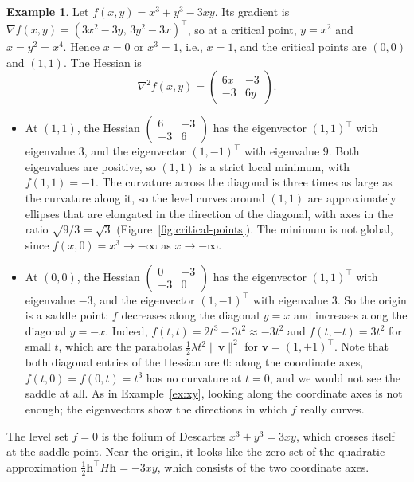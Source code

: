 \documentclass[11pt]{article}
\newcommand{\norm}[1]{\lVert #1 \rVert}
\theoremstyle{definition}
\newtheorem{example}[definition]{Example}
\theoremstyle{plain}
\theoremstyle{remark}
\begin{document}
\begin{example}\label{ex:critical-points}
    Let $f(x, y) = x^3 + y^3 - 3xy$. Its gradient is $\nabla f(x, y) = (3x^2 - 3y, \, 3y^2 - 3x)^\top$, so at a critical point, $y = x^2$ and $x = y^2 = x^4$. Hence $x = 0$ or $x^3 = 1$, i.e., $x = 1$, and the critical points are $(0, 0)$ and $(1, 1)$. The Hessian is
    \[\nabla^2 f(x, y) = \begin{pmatrix} 6x & -3 \\ -3 & 6y \end{pmatrix}.\]
    \begin{itemize}
        \item At $(1, 1)$, the Hessian $\begin{pmatrix} 6 & -3 \\ -3 & 6 \end{pmatrix}$ has the eigenvector $(1, 1)^\top$ with eigenvalue $3$, and the eigenvector $(1, -1)^\top$ with eigenvalue $9$. Both eigenvalues are positive, so $(1, 1)$ is a strict local minimum, with $f(1, 1) = -1$. The curvature across the diagonal is three times as large as the curvature along it, so the level curves around $(1, 1)$ are approximately ellipses that are elongated in the direction of the diagonal, with axes in the ratio $\sqrt{9/3} = \sqrt{3}$ (Figure~\ref{fig:critical-points}). The minimum is not global, since $f(x, 0) = x^3 \to -\infty$ as $x \to -\infty$.
        \item At $(0, 0)$, the Hessian $\begin{pmatrix} 0 & -3 \\ -3 & 0 \end{pmatrix}$ has the eigenvector $(1, 1)^\top$ with eigenvalue $-3$, and the eigenvector $(1, -1)^\top$ with eigenvalue $3$. So the origin is a saddle point: $f$ decreases along the diagonal $y = x$ and increases along the diagonal $y = -x$. Indeed, $f(t, t) = 2t^3 - 3t^2 \approx -3t^2$ and $f(t, -t) = 3t^2$ for small $t$, which are the parabolas $\frac{1}{2}\lambda t^2 \norm{\mathbf{v}}^2$ for $\mathbf{v} = (1, \pm 1)^\top$. Note that both diagonal entries of the Hessian are $0$: along the coordinate axes, $f(t, 0) = f(0, t) = t^3$ has no curvature at $t = 0$, and we would not see the saddle at all. As in Example~\ref{ex:xy}, looking along the coordinate axes is not enough; the eigenvectors show the directions in which $f$ really curves.
    \end{itemize}
    The level set $f = 0$ is the folium of Descartes $x^3 + y^3 = 3xy$, which crosses itself at the saddle point. Near the origin, it looks like the zero set of the quadratic approximation $\frac{1}{2}\mathbf{h}^\top H\mathbf{h} = -3xy$, which consists of the two coordinate axes.
\end{example}
\end{document}
